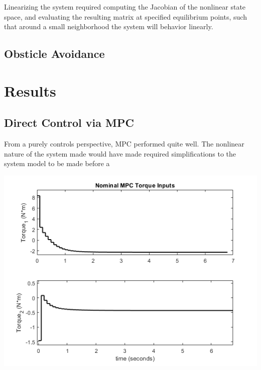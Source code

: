 \documentclass[journal]{IEEEtran}
\begin{document}
%










Linearizing the system required computing the Jacobian of the nonlinear state space, and evaluating the resulting matrix at specified equilibrium points, such that around a small neighborhood the system will behavior linearly.



\subsection{Obsticle Avoidance}


\section{Results}

\subsection{Direct Control via MPC}

From a purely controls perspective, MPC performed quite well. The nonlinear nature of the system made would have made required simplifications to the system model to be made before a

\includegraphics[scale = 0.5]{../images/Nominal_MPC/T1_X_init_25_45_0_0_X_ref_180_n45_0_0/Torques}
\end{document}
